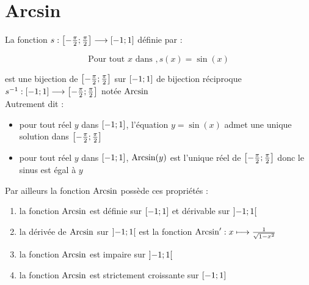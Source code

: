 \section{Arcsin}
\begin{defprop}
    La fonction \(s : \left[-\frac{\pi}{2};\frac{\pi}{2}\right] \longrightarrow \left[-1;1\right]\) définie par :

    \[\text{Pour tout } x \text{ dans },s(x) = \sin(x)\] 
    
    est une bijection de \(\left[-\frac{\pi}{2};\frac{\pi}{2}\right]\) sur \(\left[-1;1\right]\) de bijection réciproque \(s^{-1} : \left[-1;1\right] \longrightarrow \left[-\frac{\pi}{2};\frac{\pi}{2}\right]\) notée \(\operatorname{Arcsin}\)
    \\ Autrement dit : 
    \begin{itemize}
        \item pour tout réel \(y\) dans \(\left[-1;1\right]\), l'équation \(y=\sin(x)\) admet une unique solution dans \(\left[-\frac{\pi}{2};\frac{\pi}{2}\right]\)
        \item pour tout réel \(y\) dans \(\left[-1;1\right]\), \(\operatorname{Arcsin} (y)\) est l'unique réel de \(\left[-\frac{\pi}{2};\frac{\pi}{2}\right]\) donc le sinus est égal à \(y\)
    \end{itemize}
    Par ailleurs la fonction \(\operatorname{Arcsin}\) possède ces propriétés : 
    \begin{enumerate}
        \item la fonction \(\operatorname{Arcsin}\) est définie sur \(\left[-1;1\right]\) et dérivable sur \(\left]-1;1\right[\)
        \item la dérivée de \(\operatorname{Arcsin}\) sur \(\left]-1;1\right[\) est la fonction \(\operatorname{Arcsin}' : x\longmapsto \frac{1}{\sqrt{1-x^2}} \)
        \item la fonction \(\operatorname{Arcsin}\) est impaire sur \(\left]-1;1\right[\)
        \item la fonction \(\operatorname{Arcsin}\) est strictement croissante sur \(\left[-1;1\right]\)
    \end{enumerate}
\end{defprop}

